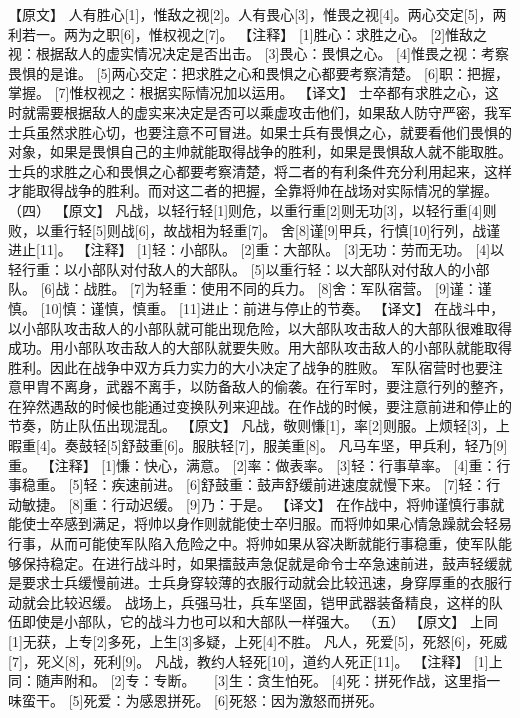 \documentclass[a4paper,12pt,UTF8,twoside]{ctexbook}
\begin{document}
【原文】
人有胜心[1]，惟敌之视[2]。人有畏心[3]，惟畏之视[4]。两心交定[5]，两利若一。两为之职[6]，惟权视之[7]。
【注释】
[1]胜心：求胜之心。
[2]惟敌之视：根据敌人的虚实情况决定是否出击。
[3]畏心：畏惧之心。
[4]惟畏之视：考察畏惧的是谁。
[5]两心交定：把求胜之心和畏惧之心都要考察清楚。
[6]职：把握，掌握。
[7]惟权视之：根据实际情况加以运用。
【译文】
士卒都有求胜之心，这时就需要根据敌人的虚实来决定是否可以乘虚攻击他们，如果敌人防守严密，我军士兵虽然求胜心切，也要注意不可冒进。如果士兵有畏惧之心，就要看他们畏惧的对象，如果是畏惧自己的主帅就能取得战争的胜利，如果是畏惧敌人就不能取胜。士兵的求胜之心和畏惧之心都要考察清楚，将二者的有利条件充分利用起来，这样才能取得战争的胜利。而对这二者的把握，全靠将帅在战场对实际情况的掌握。
（四）
【原文】
凡战，以轻行轻[1]则危，以重行重[2]则无功[3]，以轻行重[4]则败，以重行轻[5]则战[6]，故战相为轻重[7]。
舍[8]谨[9]甲兵，行慎[10]行列，战谨进止[11]。
【注释】
[1]轻：小部队。
[2]重：大部队。
[3]无功：劳而无功。
[4]以轻行重：以小部队对付敌人的大部队。
[5]以重行轻：以大部队对付敌人的小部队。
[6]战：战胜。
[7]为轻重：使用不同的兵力。
[8]舍：军队宿营。
[9]谨：谨慎。
[10]慎：谨慎，慎重。
[11]进止：前进与停止的节奏。
【译文】
在战斗中，以小部队攻击敌人的小部队就可能出现危险，以大部队攻击敌人的大部队很难取得成功。用小部队攻击敌人的大部队就要失败。用大部队攻击敌人的小部队就能取得胜利。因此在战争中双方兵力实力的大小决定了战争的胜败。
军队宿营时也要注意甲胄不离身，武器不离手，以防备敌人的偷袭。在行军时，要注意行列的整齐，在猝然遇敌的时候也能通过变换队列来迎战。在作战的时候，要注意前进和停止的节奏，防止队伍出现混乱。
【原文】
凡战，敬则慊[1]，率[2]则服。上烦轻[3]，上暇重[4]。奏鼓轻[5]舒鼓重[6]。服肤轻[7]，服美重[8]。
凡马车坚，甲兵利，轻乃[9]重。
【注释】
[1]慊：快心，满意。
[2]率：做表率。
[3]轻：行事草率。
[4]重：行事稳重。
[5]轻：疾速前进。
[6]舒鼓重：鼓声舒缓前进速度就慢下来。
[7]轻：行动敏捷。
[8]重：行动迟缓。
[9]乃：于是。
【译文】
在作战中，将帅谨慎行事就能使士卒感到满足，将帅以身作则就能使士卒归服。而将帅如果心情急躁就会轻易行事，从而可能使军队陷入危险之中。将帅如果从容决断就能行事稳重，使军队能够保持稳定。在进行战斗时，如果擂鼓声急促就是命令士卒急速前进，鼓声轻缓就是要求士兵缓慢前进。士兵身穿较薄的衣服行动就会比较迅速，身穿厚重的衣服行动就会比较迟缓。
战场上，兵强马壮，兵车坚固，铠甲武器装备精良，这样的队伍即使是小部队，它的战斗力也可以和大部队一样强大。
（五）
【原文】
上同[1]无获，上专[2]多死，上生[3]多疑，上死[4]不胜。
凡人，死爱[5]，死怒[6]，死威[7]，死义[8]，死利[9]。
凡战，教约人轻死[10]，道约人死正[11]。
【注释】
[1]上同：随声附和。
[2]专：专断。
　[3]生：贪生怕死。
[4]死：拼死作战，这里指一味蛮干。
[5]死爱：为感恩拼死。
[6]死怒：因为激怒而拼死。
\end{document}
